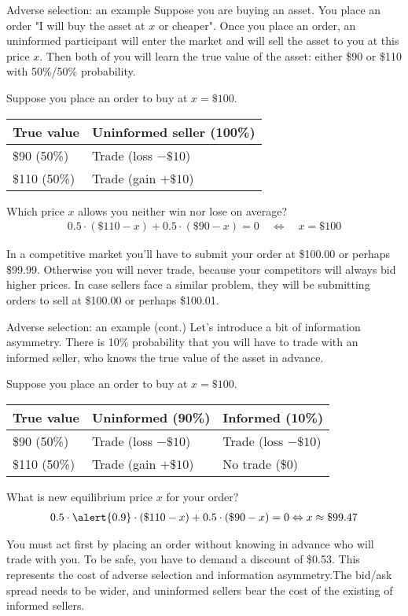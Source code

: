 \documentclass{beamer}
\begin{document}
\begin{frame}{Adverse selection: an example}
\justify
Suppose you are buying an asset. You place an order "I will buy the asset at $x$ or cheaper". Once you place an order, an uninformed participant will enter the market and will sell the asset to you at this price $x$. Then both of you will learn the true value of the asset: either \$90 or \$110 with 50\%/50\% probability.

\justify
Suppose you place an order to buy at $x=\$100$.

\centering
\begin{tabular}{l|l}
True value & Uninformed seller (100\%)  \\ \hline
\$90 (50\%) & Trade (loss $-\$10$) \\ \hline
\$110 (50\%) & Trade (gain $+\$10$) 
\end{tabular}

\justify
Which price $x$ allows you neither win nor lose on average?
\begin{align*}
0.5\cdot(\$110 - x) + 0.5\cdot(\$90 - x) = 0 \quad \Leftrightarrow \quad x = \$100
\end{align*}

\justify
In a competitive market you'll have to submit your order at \$100.00 or perhaps \$99.99. Otherwise you will never trade, because your competitors will always bid higher prices. In case sellers face a similar problem, they will be submitting orders to sell at \$100.00 or perhaps \$100.01.
\end{frame}



\begin{frame}{Adverse selection: an example (cont.)}
\justify
Let's introduce a bit of information asymmetry. There is 10\% probability that you will have to trade with an \alert{informed} seller, who knows the true value of the asset in advance.

\justify
Suppose you place an order to buy at $x=\$100$.

\centering
\begin{tabular}{l|l|l}
True value & Uninformed (90\%) & Informed (10\%) \\ \hline
\$90 (50\%) & Trade (loss $-\$10$) & Trade (loss $-\$10$) \\ \hline
\$110 (50\%) & Trade (gain $+\$10$) & No trade (\$0) 
\end{tabular}

\justify
What is new equilibrium price $x$ for your order?
\begin{align*}
0.5\cdot\alert{0.9}\cdot(\$110 - x) + 0.5 \cdot (\$90 - x) = 0 \Leftrightarrow x \approx \$99.47
\end{align*}

\justify
You must act first by placing an order without knowing in advance who will trade with you. To be safe, you have to demand a discount of \$0.53. This represents the cost of adverse selection and information asymmetry.The bid/ask spread needs to be wider, and uninformed sellers bear the cost of the existing of informed sellers.
\end{frame}
\end{document}
